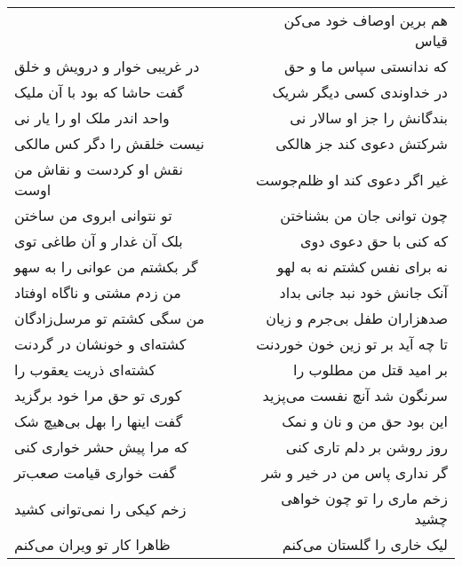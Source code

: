 \begin{center}
\begin{longtable}{l p{0.5cm} r}
&&
هم برین اوصاف خود می‌کن قیاس
\\
در غریبی خوار و درویش و خلق
&&
که ندانستی سپاس ما و حق
\\
گفت حاشا که بود با آن ملیک
&&
در خداوندی کسی دیگر شریک
\\
واحد اندر ملک او را یار نی
&&
بندگانش را جز او سالار نی
\\
نیست خلقش را دگر کس مالکی
&&
شرکتش دعوی کند جز هالکی
\\
نقش او کردست و نقاش من اوست
&&
غیر اگر دعوی کند او ظلم‌جوست
\\
تو نتوانی ابروی من ساختن
&&
چون توانی جان من بشناختن
\\
بلک آن غدار و آن طاغی توی
&&
که کنی با حق دعوی دوی
\\
گر بکشتم من عوانی را به سهو
&&
نه برای نفس کشتم نه به لهو
\\
من زدم مشتی و ناگاه اوفتاد
&&
آنک جانش خود نبد جانی بداد
\\
من سگی کشتم تو مرسل‌زادگان
&&
صدهزاران طفل بی‌جرم و زیان
\\
کشته‌ای و خونشان در گردنت
&&
تا چه آید بر تو زین خون خوردنت
\\
کشته‌ای ذریت یعقوب را
&&
بر امید قتل من مطلوب را
\\
کوری تو حق مرا خود برگزید
&&
سرنگون شد آنچ نفست می‌پزید
\\
گفت اینها را بهل بی‌هیچ شک
&&
این بود حق من و نان و نمک
\\
که مرا پیش حشر خواری کنی
&&
روز روشن بر دلم تاری کنی
\\
گفت خواری قیامت صعب‌تر
&&
گر نداری پاس من در خیر و شر
\\
زخم کیکی را نمی‌توانی کشید
&&
زخم ماری را تو چون خواهی چشید
\\
ظاهرا کار تو ویران می‌کنم
&&
لیک خاری را گلستان می‌کنم
\\
\end{longtable}
\end{center}
